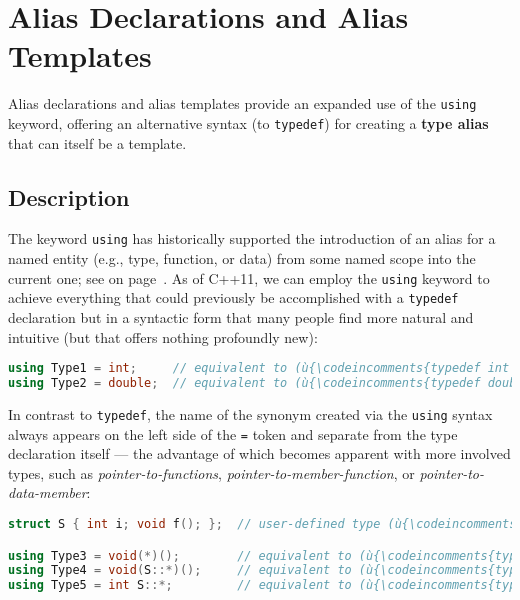 \newpage
\section[Alias Declarations and Alias Templates]{Alias Declarations and Alias Templates}\label{alias-declarations-and-alias-templates}


Alias declarations and alias templates provide an expanded use of the
\texttt{using} keyword, offering an alternative syntax (to
\texttt{typedef}) for creating a \textbf{type alias} that can itself be
a template.

\subsection[Description]{Description}\label{description}

The keyword \texttt{using} has historically supported the introduction
of an alias for a named entity (e.g., type, function, or data) from some
named scope into the current one; see {\it{}} on page~\pageref{appendix:-brief-review-of-(c++03)-using-declarations}. As of C++11, we can
employ the \texttt{using} keyword to achieve everything that could
previously be accomplished with a \texttt{typedef} declaration but in a
syntactic form that many people find more natural and intuitive (but
that offers nothing profoundly new):

\begin{lstlisting}[language=C++]
using Type1 = int;     // equivalent to (ù{\codeincomments{typedef int Type1;}}ù)
using Type2 = double;  // equivalent to (ù{\codeincomments{typedef double Type2;}}ù)
\end{lstlisting}

\noindent In contrast to \texttt{typedef}, the name of the synonym created via the
\texttt{using} syntax always appears on the left side of the \texttt{=}
token and separate from the type declaration itself --- the advantage of
which becomes apparent with more involved types, such as
\emph{pointer-to-functions}, \emph{pointer-to-member-function}, or
\emph{pointer-to-data-member}:

\begin{lstlisting}[language=C++]
struct S { int i; void f(); };  // user-defined type (ù{\codeincomments{S}}ù) defined at file scope

using Type3 = void(*)();        // equivalent to (ù{\codeincomments{typedef void(*Type3)();}}ù)
using Type4 = void(S::*)();     // equivalent to (ù{\codeincomments{typedef void(S::*Type4)();}}ù)
using Type5 = int S::*;         // equivalent to (ù{\codeincomments{typedef int S::*Type5;}}ù)
\end{lstlisting}

